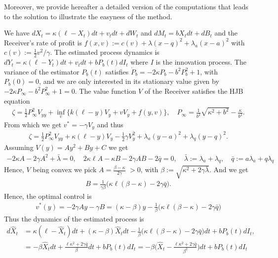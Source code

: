\documentclass[a4paper,10pt]{article}
\theoremstyle{definition}
\theoremstyle{plain}
\numberwithin{equation}{section}
\newcommand{\hs}{\vspace{3mm}}
\begin{document}
\hs

Moreover, we provide hereafter a detailed version of the computations that leads to the solution to illustrate the easyness of the method.

\hs

We have $dX_t = \kappa (\ell - X_t) dt + v_t dt  + dW_t$ and $dM_t = b X_t dt + dB_t$ and the Receiver's rate of profit is $f(x,v) := c(v) + \lambda (x-q)^2 + \lambda_a (x-a)^2$ with $c(v) := \frac12 v^2/\gamma$. The estimated process dynamics is $dY_t = \kappa (\ell - Y_t) dt + v_t dt+ b P_b(t) dI_t$ where $I$ is the innovation process.  The variance of the estimator $P_b(t)$ satisfies
$\dot P_b = - 2 \kappa P_b - b^2 P_b^2 + 1$, with $P_b(0) = 0$, and we are only interested in its stationary value given by $- 2 \kappa P_\infty - b^2 P_\infty^2 + 1 = 0$. The value function $V$ of the Receiver satisfies the HJB equation
\begin{align*}
\zeta = \frac12 P_\infty^2 V_{yy} + \inf_{v} \big\{ k(\ell - y) V_y  + v V_y + f(y,v) \}, \quad
P_\infty = \frac1{b^2} \sqrt{\kappa^2 + b^2} - \frac{\kappa}{b^2}.
\end{align*}
From which we get $v^\ast = - \gamma V_y$ and thus
\begin{align*}
\zeta = \frac12 P_\infty^2 V_{yy} + \kappa (\ell - y) V_y  - \frac12 \gamma V_y^2 + \lambda_a (y -a)^2 + \lambda_q (y-q)^2.
\end{align*}
Assuming $V(y) = A y^2 + B y + C$ we get
\begin{align*}
-2\kappa A  - 2 \gamma A^2 + \bar\lambda = 0, \quad
2 \kappa \ell A - \kappa B -  2\gamma AB -  2\bar q  = 0, \quad \bar\lambda := \lambda_a + \lambda_q, \quad
\bar q := a \lambda_a + q \lambda_q
\end{align*}
Hence, $V$ being convex we pick $A = \frac{\beta - \kappa}{2\gamma}$ $>0$, with $\beta := \sqrt{\kappa^2 + 2\gamma\bar\lambda}$. And we get 
\begin{align*}
B =  \frac{1}{\gamma \beta} \Big( \kappa\ell(\beta-\kappa) - 2\gamma \bar q\Big).
\end{align*}
Hence, the optimal control is
\begin{align*}
v^\ast (y)= - 2 \gamma A y - \gamma B = (\kappa - \beta) y - \frac{1}{\beta}\Big( \kappa\ell(\beta-\kappa)-2 \gamma\bar q\Big)
\end{align*}
Thus the dynamics of the estimated process is
\begin{align*}
d\hat X_t  & = \kappa (\ell - \hat X_t) dt + (\kappa - \beta) \hat X_t dt - \frac{1}{\beta}\Big( \kappa\ell(\beta-\kappa)-2 \gamma\bar q\Big) dt + b P_b(t) dI_t, \\
& = -\beta \hat X_t dt + \frac{\ell \kappa^2 + 2\gamma \bar q}{\beta} dt + b P_b(t) dI_t 
= -\beta \Big(\hat X_t -  \frac{\ell \kappa^2 + 2\gamma \bar q}{\beta^2}\Big) dt 
+ b P_b(t) dI_t
\end{align*}
\end{document}
